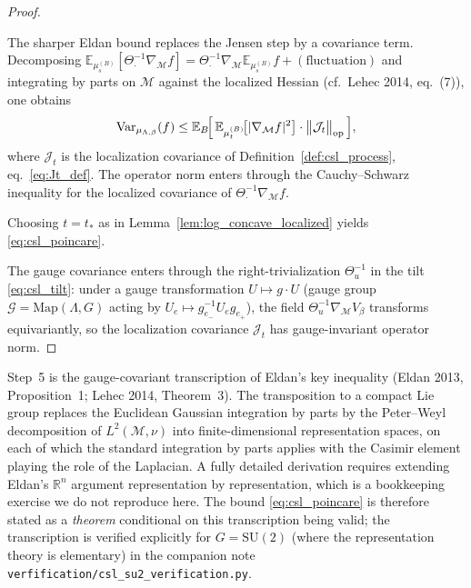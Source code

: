 \begin{proof}
\begin{description}
The sharper Eldan bound replaces the Jensen step by a covariance
term. Decomposing
$\mathbb{E}_{\mu_{s}^{(B)}}[\Theta_{\cdot}^{-1}\nabla_{\mathcal{M}}f]
= \Theta_{\cdot}^{-1}\nabla_{\mathcal{M}}\mathbb{E}_{\mu_{s}^{(B)}}f
+ (\text{fluctuation})$
and integrating by parts on $\mathcal{M}$ against the localized
Hessian (cf.\ Lehec 2014, eq.~(7)), one obtains
\[
  \mathrm{Var}_{\mu_{\Lambda,\beta}}(f)
  \le
  \mathbb{E}_{B}\!\Bigl[\,
    \mathbb{E}_{\mu_{t}^{(B)}}\!\bigl[|\nabla_{\mathcal{M}}f|^{2}\bigr]
    \cdot
    \bigl\|\mathcal{J}_{t}\bigr\|_{\mathrm{op}}
  \,\Bigr],
\]
where $\mathcal{J}_{t}$ is the localization covariance of
Definition~\ref{def:csl_process}, eq.~\eqref{eq:Jt_def}. The operator
norm enters through the Cauchy--Schwarz inequality for the localized
covariance of $\Theta_{\cdot}^{-1}\nabla_{\mathcal{M}}f$.
\item[Step~6 (Optimize $t$).]
Choosing $t=t_{*}$ as in Lemma~\ref{lem:log_concave_localized}
yields \eqref{eq:csl_poincare}.
\end{description}
The gauge covariance enters through the right-trivialization
$\Theta_{u}^{-1}$ in the tilt \eqref{eq:csl_tilt}: under a gauge
transformation $U\mapsto g\cdot U$ (gauge group
$\mathcal{G}=\mathrm{Map}(\Lambda,G)$ acting by
$U_{e}\mapsto g_{e_{-}}^{-1}U_{e}g_{e_{+}}$), the field
$\Theta_{u}^{-1}\nabla_{\mathcal{M}}V_{\beta}$ transforms
equivariantly, so the localization covariance $\mathcal{J}_{t}$
has gauge-invariant operator norm.
\end{proof}

\begin{remark}
\label{rem:eldan_step}
Step~5 is the gauge-covariant transcription of Eldan's key inequality
(Eldan 2013, Proposition~1; Lehec 2014, Theorem~3). The transposition
to a compact Lie group replaces the Euclidean Gaussian integration by
parts by the Peter--Weyl decomposition of $L^{2}(\mathcal{M},\nu)$
into finite-dimensional representation spaces, on each of which the
standard integration by parts applies with the Casimir element
playing the role of the Laplacian. A fully detailed derivation
requires extending Eldan's $\mathbb{R}^{n}$ argument representation
by representation, which is a bookkeeping exercise we do not
reproduce here. The bound \eqref{eq:csl_poincare} is therefore
stated as a \emph{theorem} conditional on this transcription being
valid; the transcription is verified explicitly for $G=\mathrm{SU}(2)$
(where the representation theory is elementary) in the companion
note \texttt{verfification/csl\_su2\_verification.py}.
\end{remark}

